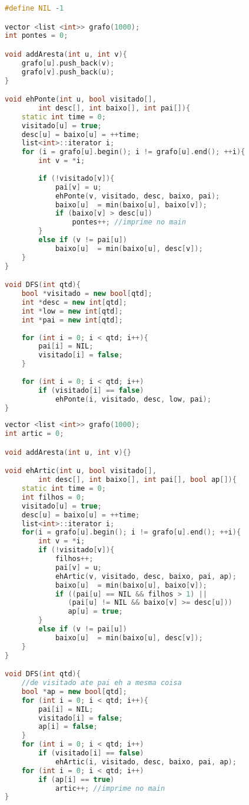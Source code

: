 \begin{lstlisting}[language=C++, title={Pontes}]
#define NIL -1

vector <list <int>> grafo(1000);
int pontes = 0;

void addAresta(int u, int v){
    grafo[u].push_back(v);
    grafo[v].push_back(u);
}

void ehPonte(int u, bool visitado[], 
        int desc[], int baixo[], int pai[]){
    static int time = 0;
    visitado[u] = true;
    desc[u] = baixo[u] = ++time;
    list<int>::iterator i;
    for (i = grafo[u].begin(); i != grafo[u].end(); ++i){
        int v = *i;
 
        if (!visitado[v]){
            pai[v] = u;
            ehPonte(v, visitado, desc, baixo, pai);
            baixo[u]  = min(baixo[u], baixo[v]);
            if (baixo[v] > desc[u])
                pontes++; //imprime no main
        }
        else if (v != pai[u])
            baixo[u]  = min(baixo[u], desc[v]);
    }
}

void DFS(int qtd){
    bool *visitado = new bool[qtd];
    int *desc = new int[qtd];
    int *low = new int[qtd];
    int *pai = new int[qtd];
 
    for (int i = 0; i < qtd; i++){
        pai[i] = NIL;
        visitado[i] = false;
    }
 
    for (int i = 0; i < qtd; i++)
        if (visitado[i] == false)
            ehPonte(i, visitado, desc, low, pai);
}
\end{lstlisting}
\begin{lstlisting}[language=C++, title={Pontos de Articulação}]
vector <list <int>> grafo(1000);
int artic = 0;

void addAresta(int u, int v){}

void ehArtic(int u, bool visitado[], 
        int desc[], int baixo[], int pai[], bool ap[]){
    static int time = 0;
    int filhos = 0;
    visitado[u] = true;
    desc[u] = baixo[u] = ++time;
    list<int>::iterator i;
    for(i = grafo[u].begin(); i != grafo[u].end(); ++i){
        int v = *i;
        if (!visitado[v]){
            filhos++;
            pai[v] = u;
            ehArtic(v, visitado, desc, baixo, pai, ap);
            baixo[u]  = min(baixo[u], baixo[v]);
            if ((pai[u] == NIL && filhos > 1) ||
               (pai[u] != NIL && baixo[v] >= desc[u]))
               ap[u] = true;
        }
        else if (v != pai[u])
            baixo[u]  = min(baixo[u], desc[v]);
    }
}

void DFS(int qtd){
    //de visitado ate pai eh a mesma coisa
    bool *ap = new bool[qtd];
    for (int i = 0; i < qtd; i++){
        pai[i] = NIL;
        visitado[i] = false;
        ap[i] = false;
    }
    for (int i = 0; i < qtd; i++)
        if (visitado[i] == false)
            ehArtic(i, visitado, desc, baixo, pai, ap);
    for (int i = 0; i < qtd; i++)
        if (ap[i] == true)
            artic++; //imprime no main
}
\end{lstlisting}